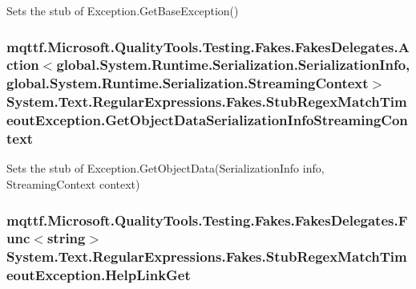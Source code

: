 Sets the stub of Exception.\-Get\-Base\-Exception()

\hypertarget{class_system_1_1_text_1_1_regular_expressions_1_1_fakes_1_1_stub_regex_match_timeout_exception_a5775626d9d64b6825ae00aed8f091e3d}{
\subsubsection[{Get\-Object\-Data\-Serialization\-Info\-Streaming\-Context}]{\setlength{\rightskip}{0pt plus 5cm}mqttf.\-Microsoft.\-Quality\-Tools.\-Testing.\-Fakes.\-Fakes\-Delegates.\-Action$<$global.\-System.\-Runtime.\-Serialization.\-Serialization\-Info, global.\-System.\-Runtime.\-Serialization.\-Streaming\-Context$>$ System.\-Text.\-Regular\-Expressions.\-Fakes.\-Stub\-Regex\-Match\-Timeout\-Exception.\-Get\-Object\-Data\-Serialization\-Info\-Streaming\-Context}}\label{class_system_1_1_text_1_1_regular_expressions_1_1_fakes_1_1_stub_regex_match_timeout_exception_a5775626d9d64b6825ae00aed8f091e3d}


Sets the stub of Exception.\-Get\-Object\-Data(\-Serialization\-Info info, Streaming\-Context context)

\hypertarget{class_system_1_1_text_1_1_regular_expressions_1_1_fakes_1_1_stub_regex_match_timeout_exception_ac3a20333d7bfd3c4e50e80fde8f17d4d}{
\subsubsection[{Help\-Link\-Get}]{\setlength{\rightskip}{0pt plus 5cm}mqttf.\-Microsoft.\-Quality\-Tools.\-Testing.\-Fakes.\-Fakes\-Delegates.\-Func$<$string$>$ System.\-Text.\-Regular\-Expressions.\-Fakes.\-Stub\-Regex\-Match\-Timeout\-Exception.\-Help\-Link\-Get}}\label{class_system_1_1_text_1_1_regular_expressions_1_1_fakes_1_1_stub_regex_match_timeout_exception_ac3a20333d7bfd3c4e50e80fde8f17d4d}


